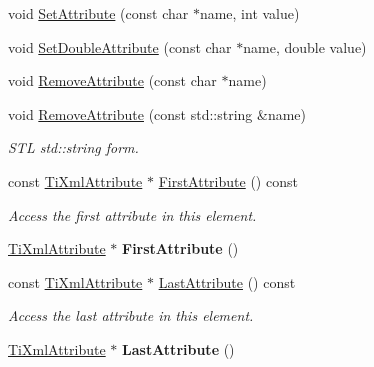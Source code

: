 \begin{DoxyCompactItemize}
\item 
void \hyperlink{class_ti_xml_element_ace6f4be75e373726d4774073d666d1a7}{Set\+Attribute} (const char $\ast$name, int value)
\item 
void \hyperlink{class_ti_xml_element_a0d1dd975d75496778177e35abfe0ec0b}{Set\+Double\+Attribute} (const char $\ast$name, double value)
\item 
void \hyperlink{class_ti_xml_element_a56979767deca794376b1dfa69a525b2a}{Remove\+Attribute} (const char $\ast$name)
\item 
\hypertarget{class_ti_xml_element_a1afa6aea716511326a608e4c05df4f3a}{void \hyperlink{class_ti_xml_element_a1afa6aea716511326a608e4c05df4f3a}{Remove\+Attribute} (const std\+::string \&name)}\label{class_ti_xml_element_a1afa6aea716511326a608e4c05df4f3a}

\begin{DoxyCompactList}\small\item\em S\+T\+L std\+::string form. \end{DoxyCompactList}\item 
\hypertarget{class_ti_xml_element_a516054c9073647d6cb29b6abe9fa0592}{const \hyperlink{class_ti_xml_attribute}{Ti\+Xml\+Attribute} $\ast$ \hyperlink{class_ti_xml_element_a516054c9073647d6cb29b6abe9fa0592}{First\+Attribute} () const }\label{class_ti_xml_element_a516054c9073647d6cb29b6abe9fa0592}

\begin{DoxyCompactList}\small\item\em Access the first attribute in this element. \end{DoxyCompactList}\item 
\hypertarget{class_ti_xml_element_a4b33780fc565d38d6b54f640e0cf1737}{\hyperlink{class_ti_xml_attribute}{Ti\+Xml\+Attribute} $\ast$ {\bfseries First\+Attribute} ()}\label{class_ti_xml_element_a4b33780fc565d38d6b54f640e0cf1737}

\item 
\hypertarget{class_ti_xml_element_a86191b49f9177be132b85b14655f1381}{const \hyperlink{class_ti_xml_attribute}{Ti\+Xml\+Attribute} $\ast$ \hyperlink{class_ti_xml_element_a86191b49f9177be132b85b14655f1381}{Last\+Attribute} () const }\label{class_ti_xml_element_a86191b49f9177be132b85b14655f1381}

\begin{DoxyCompactList}\small\item\em Access the last attribute in this element. \end{DoxyCompactList}\item 
\hypertarget{class_ti_xml_element_a222f81cf06155cd108f2a68d4d176004}{\hyperlink{class_ti_xml_attribute}{Ti\+Xml\+Attribute} $\ast$ {\bfseries Last\+Attribute} ()}\label{class_ti_xml_element_a222f81cf06155cd108f2a68d4d176004}


\end{DoxyCompactItemize}
